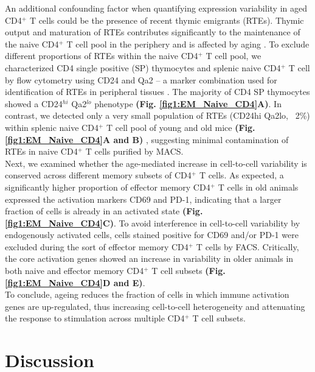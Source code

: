 An additional confounding factor when quantifying expression variability in aged CD4$^+$ T cells could be the presence of recent thymic emigrants (RTEs). Thymic output and maturation of RTEs contributes significantly to the maintenance of the naive CD4$^+$ T cell pool in the periphery and is affected by aging \citep{Boursalian2004, Hale2006, Fink2013}. To exclude different proportions of RTEs within the naive CD4$^+$ T cell pool, we characterized CD4 single positive (SP) thymocytes and splenic naive CD4$^+$ T cell by flow cytometry using CD24 and Qa2 – a marker combination used for identification of RTEs in peripheral tissues \citep{Boursalian2004, Hale2006}. The majority of CD4 SP thymocytes showed a CD24$^{hi}$ Qa2$^{lo}$ phenotype \textbf{(Fig. \ref{fig1:EM_Naive_CD4}A)}. In contrast, we detected only a very small population of RTEs (CD24hi Qa2lo, ~2\%) within splenic naive CD4$^+$ T cell pool of young and old mice \textbf{(Fig. \ref{fig1:EM_Naive_CD4}A and B)} \citep{Hale2006}, suggesting minimal contamination of RTEs in naive CD4$^+$ T cells purified by MACS.\\

Next, we examined whether the age-mediated increase in cell-to-cell variability is conserved across different memory subsets of CD4$^+$ T cells. As expected, a significantly higher proportion of effector memory CD4$^+$ T cells in old animals expressed the activation markers CD69 and PD-1, indicating that a larger fraction of cells is already in an activated state \textbf{(Fig. \ref{fig1:EM_Naive_CD4}C)}. To avoid interference in cell-to-cell variability by endogenously activated cells, cells stained positive for CD69 and/or PD-1 were excluded during the sort of effector memory CD4$^+$ T cells by FACS. Critically, the core activation genes showed an increase in variability in older animals in both naive and effector memory CD4$^+$ T cell subsets \textbf{(Fig. \ref{fig1:EM_Naive_CD4}D and E)}.\\

To conclude, ageing reduces the fraction of cells in which immune activation genes are up-regulated, thus increasing cell-to-cell heterogeneity and attenuating the response to stimulation across multiple CD4$^+$ T cell subsets.

\newpage

\section{Discussion}


